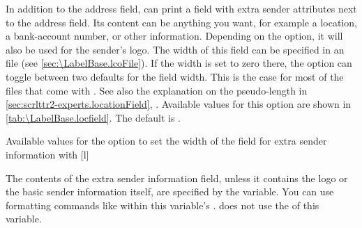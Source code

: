 \begin{Declaration}
\end{Declaration}
%
In addition to the address field,  can print a field with
extra sender attributes next to the address field. Its content can be
anything you want, for example a location, a bank-account number, or other
information. Depending on the
 option, it will also be used for the
sender's logo. The width of this field can be specified in an  file
(see \autoref{sec:\LabelBase.lcoFile}). If the width is set to zero there, the
 option can toggle between two defaults for the field width.
This is the case for most of the  files that come with
\KOMAScript{}. See also the explanation on the 
pseudo-length in \autoref{sec:scrlttr2-experts.locationField},
. Available values for this
option are shown in \autoref{tab:\LabelBase.locfield}. The default is
.%
%
\begin{table}
  \setcapindent{0pt}%
  \begin{captionbeside}
    {Available values for the  option to
      set the width of the field for extra sender information with
      \label{tab:\LabelBase.locfield}}%
    [l]
    \begin{minipage}[t]{.45\linewidth}
      \begin{desctabular}[t]
      \end{desctabular}
    \end{minipage}
  \end{captionbeside}
\end{table}

\begin{Declaration}
\end{Declaration}
The contents of the extra sender information field, unless it contains
the logo or the basic sender information itself, are specified by the
 variable. You can use formatting commands like
 within this variable's . \KOMAScript{} does
not use the  of this variable.


